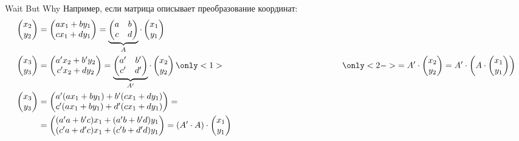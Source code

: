 \documentclass[utf8,xcolor=table]{beamer}
\begin{document}
\begin{frame}[t]{Wait But Why}
	Например, если матрица описывает преобразование координат:
	\begin{align*}
		\begin{pmatrix} x_2 \\ y_2 \end{pmatrix} &=
			\begin{pmatrix}ax_1 + by_1 \\ cx_1 + dy_1\end{pmatrix} =
			\underbrace{\begin{pmatrix}a & b \\ c & d\end{pmatrix}}_{A} \cdot \begin{pmatrix}x_1 \\ y_1\end{pmatrix} \\
		\begin{pmatrix} x_3 \\ y_3 \end{pmatrix} &=
			\begin{pmatrix}a'x_2 + b'y_2 \\ c'x_2 + dy_2\end{pmatrix} =
			\underbrace{\begin{pmatrix}a' & b' \\ c' & d'\end{pmatrix}}_{A'} \cdot \begin{pmatrix}x_2 \\ y_2\end{pmatrix}
			\only<1>{\phantom{=A' \cdot \begin{pmatrix}x_2 \\ y_2\end{pmatrix} = A' \cdot \left(A \cdot \begin{pmatrix} x_1 \\ y_1\end{pmatrix}\right)}}
			\only<2->{=A' \cdot \begin{pmatrix}x_2 \\ y_2\end{pmatrix} = A' \cdot \left(A \cdot \begin{pmatrix} x_1 \\ y_1\end{pmatrix}\right)}
			\\
		\begin{pmatrix} x_3 \\ y_3 \end{pmatrix} &=
			\begin{pmatrix}a'(ax_1+by_1) + b'(cx_1+dy_1) \\ c'(ax_1+by_1) + d'(cx_1+dy_1)\end{pmatrix} = \\
		&=	\begin{pmatrix}(a'a+b'c)x_1+(a'b+b'd)y_1 \\ (c'a+d'c)x_1+(c'b+d'd)y_1 \end{pmatrix} =
			(A'\cdot A)\cdot\begin{pmatrix}x_1 \\ y_1\end{pmatrix}
	\end{align*}
\end{frame}
\end{document}
